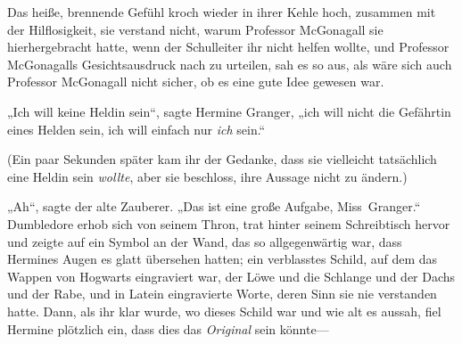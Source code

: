 Das heiße, brennende Gefühl kroch wieder in ihrer Kehle hoch, zusammen mit der Hilflosigkeit, sie verstand nicht, warum Professor McGonagall sie hierhergebracht hatte, wenn der Schulleiter ihr nicht helfen wollte, und Professor McGonagalls Gesichtsausdruck nach zu urteilen, sah es so aus, als wäre sich auch Professor McGonagall nicht sicher, ob es eine gute Idee gewesen war.

„Ich will keine Heldin sein“, sagte Hermine Granger, „ich will nicht die Gefährtin eines Helden sein, ich will einfach nur \emph{ich} sein.“

(Ein paar Sekunden später kam ihr der Gedanke, dass sie vielleicht tatsächlich eine Heldin sein \emph{wollte}, aber sie beschloss, ihre Aussage nicht zu ändern.)

„Ah“, sagte der alte Zauberer. „Das ist eine große Aufgabe, Miss~Granger.“ Dumbledore erhob sich von seinem Thron, trat hinter seinem Schreibtisch hervor und zeigte auf ein Symbol an der Wand, das so allgegenwärtig war, dass Hermines Augen es glatt übersehen hatten; ein verblasstes Schild, auf dem das Wappen von Hogwarts eingraviert war, der Löwe und die Schlange und der Dachs und der Rabe, und in Latein eingravierte Worte, deren Sinn sie nie verstanden hatte. Dann, als ihr klar wurde, wo dieses Schild war und wie alt es aussah, fiel Hermine plötzlich ein, dass dies das \emph{Original} sein könnte—

